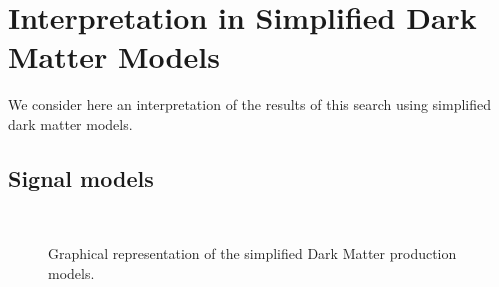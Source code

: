 \section{Interpretation in Simplified Dark Matter Models}
\label{sec:DM}

We consider here an interpretation of the results of this search using simplified dark matter models.

\subsection{Signal models}
\label{sec:DM_models}

\begin{figure}[h!]
    \begin{center}
        ~~
        ~~
        ~~
        \caption{
            Graphical representation of the simplified Dark Matter production models.
        }
        \label{fig:DM-Feynman}
    \end{center}
\end{figure}


